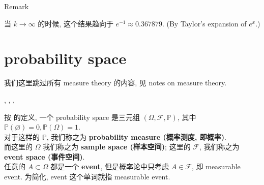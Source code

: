 \begin{qlremark}{Remark}

当 \(\mathit{k}\rightarrow\infty\) 的时候, 这个结果趋向于 \(\mathit{e}^{- 1} \approx 0.367879\). (By Taylor's expansion of \(\mathit{e}^{\mathit{x}}\).)

\end{qlremark}

\section{probability space}\label{probability-space}

我们这里跳过所有 measure theory 的内容, 见 notes on measure theory.\\

\begin{definition}{, , ,
}

按  的定义, 一个 probability space 是三元组 \((\Omega,\mathcal{F},\mathbb{P})\), 其中 \(\mathbb{P}(\varnothing) = 0,\mathbb{P}(\Omega) = 1\).\\
对于这样的  \(\mathbb{P}\), 我们称之为 \textbf{probability measure (概率测度, 即概率)}.\\
而这里的 \(\Omega\) 我们称之为 \textbf{sample space (样本空间)}; 这里的  \(\mathcal{F}\), 我们称之为 \textbf{event space (事件空间)}.\\
任意的 \(\mathit{A} \subset \Omega\) 都是一个 \textbf{event}, 但是概率论中只考虑 \(\mathit{A} \in \mathcal{F}\), 即 measurable event. 为简化, event 这个单词就指 measurable event.

\end{definition}

